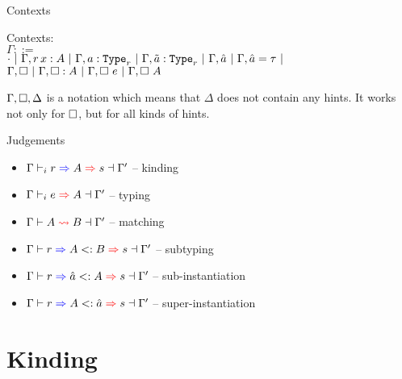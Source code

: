 \documentclass{beamer}
\begin{document}
\begin{frame}{Contexts}

Contexts: \\
$\Gamma ::=$ \\
\qquad $\emptyctx \pipe \Gamma, \var[r]{x}{A} \pipe \Gamma, \tvar{a}[r] \pipe \Gamma, \stvar{a}[r] \pipe \Gamma, \evar{a} \pipe \Gamma, \evar{a}[\tau] \pipe$ \\
\qquad $\Gamma, \square \ |\  \Gamma, \square : A \ |\  \Gamma, \square\ e \ |\  \Gamma, \square\ A$

\vspace{2em}

$\Gamma, \square, \Delta$ is a notation which means that $\Delta$ does not contain any hints. It works not only for $\square$, but for all kinds of hints.

\end{frame}

\begin{frame}{Judgements}

\begin{itemize}
  \item $\newkinding{\Gamma}{r}{A}{s}{\Gamma'}$ -- kinding
  \item $\infer{\Gamma}{e}{A}{\Gamma'}$ -- typing
  \item $\matching{\Gamma}{A}{B}{\Gamma'}$ -- matching
  \item $\subtyping{\Gamma}{r}{A}{B}{s}{\Gamma'}$ -- subtyping
  \item $\subinst{\Gamma}{r}{\evar{a}}{A}{s}{\Gamma'}$ -- sub-instantiation
  \item $\superinst{\Gamma}{r}{A}{\evar{a}}{s}{\Gamma'}$ -- super-instantiation

\end{itemize}

\end{frame}

\section{Kinding}


\end{document}
